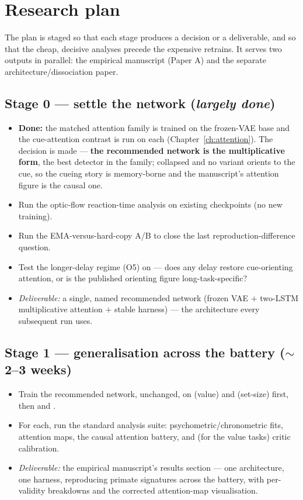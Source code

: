 \chapter{Research plan}
\label{ch:plan}

The plan is staged so that each stage produces a decision or a deliverable, and so that the
cheap, decisive analyses precede the expensive retrains. It serves two outputs in parallel:
the empirical manuscript (Paper A) and the separate architecture/dissociation paper.

\section{Stage 0 --- settle the network (\emph{largely done})}
\begin{itemize}
\item \textbf{Done:} the matched attention family is trained on the frozen-VAE base and the
cue-attention contrast is run on each (Chapter~\ref{ch:attention}). The decision is made ---
\textbf{the recommended network is the  multiplicative form}, the best
detector in the family;  collapsed and no variant orients to the cue, so the
cueing story is memory-borne and the manuscript's attention figure is the causal one.
\item Run the optic-flow reaction-time analysis on existing checkpoints (no new training).
\item Run the EMA-versus-hard-copy A/B to close the last reproduction-difference question.
\item Test the longer-delay regime (O5) on  --- does any delay restore
cue-orienting attention, or is the published orienting figure long-task-specific?
\item \emph{Deliverable:} a single, named recommended network (frozen VAE $+$ two-LSTM
multiplicative attention $+$ stable harness) --- the architecture every subsequent run uses.
\end{itemize}

\section{Stage 1 --- generalisation across the battery ($\sim$2--3 weeks)}
\begin{itemize}
\item Train the recommended network, unchanged, on  (value) and
 (set-size) first, then  and .
\item For each, run the standard analysis suite: psychometric/chronometric fits,
attention maps, the causal attention battery, and (for the value tasks) critic calibration.
\item \emph{Deliverable:} the empirical manuscript's results section --- one architecture,
one harness, reproducing primate signatures across the battery, with per-validity
breakdowns and the corrected attention-map visualisation.
\end{itemize}

